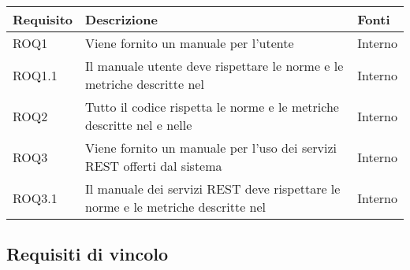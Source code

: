 \begin{center}

	\def\arraystretch{1.5}
	\bgroup
	\begin{longtable}{| p{2.5cm} | p{8cm} | p{2cm} |}

		\hline
		\textbf{Requisito} & \textbf{Descrizione} & \textbf{Fonti} \\
		\hline

		ROQ1  &  Viene fornito un manuale per l'utente  &  Interno \\
		\hline
		ROQ1.1  &  Il manuale utente deve rispettare le norme e le metriche descritte nel \docNameVersionPdQ  &  Interno \\
		\hline
		ROQ2  &  Tutto il codice rispetta le norme e le metriche descritte nel \docNameVersionPdQ{} e nelle \docNameVersionNdP  &  Interno \\
		\hline
		ROQ3  &  Viene fornito un manuale per l'uso dei servizi REST offerti dal sistema  &  Interno \\
		\hline
		ROQ3.1  &  Il manuale dei servizi REST deve rispettare le norme e le metriche descritte nel \docNameVersionPdQ  &  Interno \\
		\hline


	\end{longtable}
	\egroup
\end{center}

\subsection{Requisiti di vincolo}

